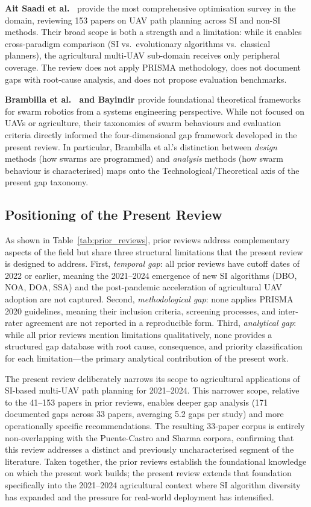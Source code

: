\documentclass[review,3p,times]{elsarticle}
\begin{document}
\textbf{Ait Saadi et al.\ \cite{aitsaadi2022}} provide the most comprehensive optimisation survey in the domain, reviewing 153 papers on UAV path planning across SI and non-SI methods. Their broad scope is both a strength and a limitation: while it enables cross-paradigm comparison (SI vs.\ evolutionary algorithms vs.\ classical planners), the agricultural multi-UAV sub-domain receives only peripheral coverage. The review does not apply PRISMA methodology, does not document gaps with root-cause analysis, and does not propose evaluation benchmarks.

\textbf{Brambilla et al.\ \cite{brambilla2013} and Bayindir \cite{bayindir2016}} provide foundational theoretical frameworks for swarm robotics from a systems engineering perspective. While not focused on UAVs or agriculture, their taxonomies of swarm behaviours and evaluation criteria directly informed the four-dimensional gap framework developed in the present review. In particular, Brambilla et al.'s distinction between \textit{design} methods (how swarms are programmed) and \textit{analysis} methods (how swarm behaviour is characterised) maps onto the Technological/Theoretical axis of the present gap taxonomy.

\subsection*{Positioning of the Present Review}

As shown in Table~\ref{tab:prior_reviews}, prior reviews address complementary aspects of the field but share three structural limitations that the present review is designed to address. First, \textit{temporal gap}: all prior reviews have cutoff dates of 2022 or earlier, meaning the 2021--2024 emergence of new SI algorithms (DBO, NOA, DOA, SSA) and the post-pandemic acceleration of agricultural UAV adoption are not captured. Second, \textit{methodological gap}: none applies PRISMA 2020 guidelines, meaning their inclusion criteria, screening processes, and inter-rater agreement are not reported in a reproducible form. Third, \textit{analytical gap}: while all prior reviews mention limitations qualitatively, none provides a structured gap database with root cause, consequence, and priority classification for each limitation---the primary analytical contribution of the present work.

The present review deliberately narrows its scope to agricultural applications of SI-based multi-UAV path planning for 2021--2024. This narrower scope, relative to the 41--153 papers in prior reviews, enables deeper gap analysis (171 documented gaps across 33 papers, averaging 5.2 gaps per study) and more operationally specific recommendations. The resulting 33-paper corpus is entirely non-overlapping with the Puente-Castro and Sharma corpora, confirming that this review addresses a distinct and previously uncharacterised segment of the literature. Taken together, the prior reviews establish the foundational knowledge on which the present work builds; the present review extends that foundation specifically into the 2021--2024 agricultural context where SI algorithm diversity has expanded and the pressure for real-world deployment has intensified.
\end{document}
